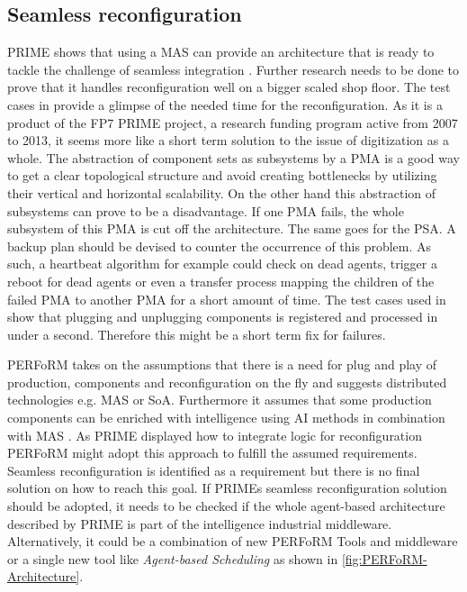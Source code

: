 \documentclass[conference,compsoc,hidelinks]{IEEEtran}
\begin{document}
\subsection{Seamless reconfiguration}
PRIME shows that using a MAS can provide an architecture that is ready to tackle the challenge of seamless integration \cite{Hybrid}. Further research needs to be done to prove that it handles reconfiguration well on a bigger scaled shop floor. The test cases in \cite{Hybrid} provide a glimpse of the needed time for the reconfiguration. As it is a product of the FP7 PRIME project, a research funding program active from 2007 to 2013, it seems more like a short term solution to the issue of digitization as a whole. The abstraction of component sets as subsystems by a PMA is a good way to get a clear topological structure and avoid creating bottlenecks by utilizing their vertical and horizontal scalability. On the other hand this abstraction of subsystems can prove to be a disadvantage. If one PMA fails, the whole subsystem of this PMA is cut off the architecture. The same goes for the PSA. A backup plan should be devised to counter the occurrence of this problem. As such, a heartbeat algorithm for example could check on dead agents, trigger a reboot for dead agents or even a transfer process mapping the children of the failed PMA to another PMA for a short amount of time. The test cases used in \cite{Hybrid} show that plugging and unplugging components is registered and processed in under a second. Therefore this might be a short term fix for failures.

PERFoRM takes on the assumptions that there is a need for plug and play of production, components and reconfiguration on the fly and suggests distributed technologies e.g. MAS or SoA. Furthermore it assumes that some production components can be enriched with intelligence using AI methods in combination with MAS \cite{SpecPERFoRM}. As PRIME displayed how to integrate logic for reconfiguration PERFoRM might adopt this approach to fulfill the assumed requirements. Seamless reconfiguration is identified as a requirement but there is no final solution on how to reach this goal. If PRIMEs seamless reconfiguration solution should be adopted, it needs to be checked if the whole agent-based architecture described by PRIME is part of the intelligence industrial middleware. Alternatively, it could be a combination of new PERFoRM Tools and middleware or a single new tool like \emph{Agent-based Scheduling} as shown in \autoref{fig:PERFoRM-Architecture}. 
\end{document}
